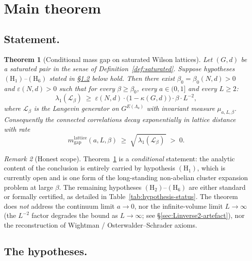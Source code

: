 \documentclass[11pt,reqno]{amsart}
\theoremstyle{plain}
\newtheorem{theorem}{Theorem}[section]
\theoremstyle{definition}
\theoremstyle{remark}
\newtheorem{remark}[theorem]{Remark}
\newcommand{\calL}{\mathcal{L}}
\newcommand{\Lat}{\Lambda}
\begin{document}
\section{Main theorem}
\label{sec:main-theorem}

\subsection{Statement.}
\begin{theorem}[Conditional mass gap on saturated Wilson lattices]
\label{thm:main}
Let $(G, d)$ be a saturated pair in the sense of Definition~\ref{def:saturated}. Suppose hypotheses $(\mathrm{H}_1)$--$(\mathrm{H}_6)$ stated in \S\ref{sec:hypotheses} below hold. Then there exist $\beta_0 = \beta_0(N, d) > 0$ and $\varepsilon(N, d) > 0$ such that for every $\beta \ge \beta_0$, every $a \in (0, 1]$ and every $L \ge 2$:
\begin{equation}
  \lambda_1(\calL_\beta) \;\ge\; \varepsilon(N, d) \cdot \bigl(1 - \kappa(G, d)\bigr) \cdot \beta \cdot L^{-2},
  \label{eq:main-gap}
\end{equation}
where $\calL_\beta$ is the Langevin generator on $G^{E(\Lat_a)}$ with invariant measure $\mu_{a, L, \beta}$. Consequently the connected correlations decay exponentially in lattice distance with rate
\begin{equation}
  m^{\mathrm{lattice}}_{\mathrm{gap}}(a, L, \beta) \;\ge\; \sqrt{\,\lambda_1(\calL_\beta)\,} \;>\; 0.
  \label{eq:main-mass-gap}
\end{equation}
\end{theorem}

\begin{remark}[Honest scope]
\label{rem:scope}
Theorem~\ref{thm:main} is a \emph{conditional} statement: the analytic content of the conclusion is entirely carried by hypothesis $(\mathrm{H}_1)$, which is currently open and is one form of the long-standing non-abelian cluster expansion problem at large $\beta$. The remaining hypotheses $(\mathrm{H}_2)$--$(\mathrm{H}_6)$ are either standard or formally certified, as detailed in Table~\ref{tab:hypothesis-status}. The theorem does \emph{not} address the continuum limit $a \to 0$, nor the infinite-volume limit $L \to \infty$ (the $L^{-2}$ factor degrades the bound as $L \to \infty$; see \S\ref{sec:Linverse2-artefact}), nor the reconstruction of Wightman / Osterwalder--Schrader axioms.
\end{remark}

\subsection{The hypotheses.}
\label{sec:hypotheses}
\end{document}
